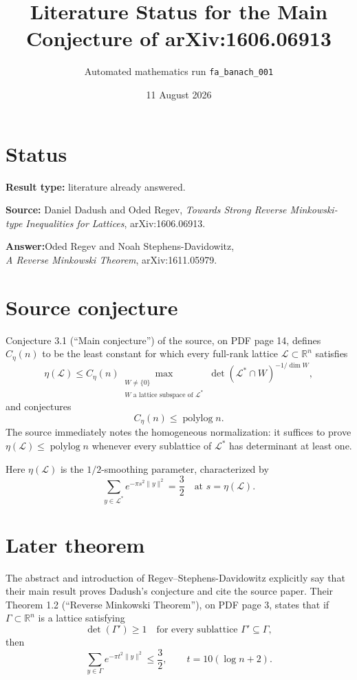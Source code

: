 \documentclass[11pt]{article}
\title{Literature Status for the Main Conjecture of arXiv:1606.06913}
\author{Automated mathematics run \texttt{fa\_banach\_001}}
\date{11 August 2026}
\newcommand{\R}{\mathbb{R}}
\newcommand{\Lcal}{\mathcal{L}}
\begin{document}
\maketitle

\section*{Status}

\textbf{Result type:} literature already answered.

\textbf{Source:} Daniel Dadush and Oded Regev,
\emph{Towards Strong Reverse Minkowski-type Inequalities for Lattices},
arXiv:1606.06913.

\textbf{Answer:}\quad Oded Regev and Noah Stephens-Davidowitz,\\
\emph{A Reverse Minkowski Theorem}, arXiv:1611.05979.

\section*{Source conjecture}

Conjecture 3.1 (``Main conjecture'') of the source, on PDF page 14, defines
$C_\eta(n)$ to be the least constant for which every full-rank lattice
$\Lcal\subset\R^n$ satisfies
\begin{equation}
 \eta(\Lcal)\le C_\eta(n)
 \max_{\substack{W\ne\{0\}\\ W\text{ a lattice subspace of }\Lcal^*}}
 \det(\Lcal^*\cap W)^{-1/\dim W},
\end{equation}
and conjectures
\[
 C_\eta(n)\le \operatorname{polylog} n.
\]
The source immediately notes the homogeneous normalization: it suffices to
prove $\eta(\Lcal)\le\operatorname{polylog}n$ whenever every sublattice of
$\Lcal^*$ has determinant at least one.

Here $\eta(\Lcal)$ is the $1/2$-smoothing parameter, characterized by
\[
 \sum_{y\in\Lcal^*} e^{-\pi s^2\lVert y\rVert^2}=\frac32
 \quad\text{at }s=\eta(\Lcal).
\]

\section*{Later theorem}

The abstract and introduction of Regev--Stephens-Davidowitz explicitly say
that their main result proves Dadush's conjecture and cite the source paper.
Their Theorem 1.2 (``Reverse Minkowski Theorem''), on PDF page 3, states that
if $\Gamma\subset\R^n$ is a lattice satisfying
\[
 \det(\Gamma')\ge1
 \quad\text{for every sublattice }\Gamma'\subseteq\Gamma,
\]
then
\begin{equation}
 \sum_{y\in\Gamma}e^{-\pi t^2\lVert y\rVert^2}\le\frac32,
 \qquad t=10(\log n+2).
\end{equation}
\end{document}
